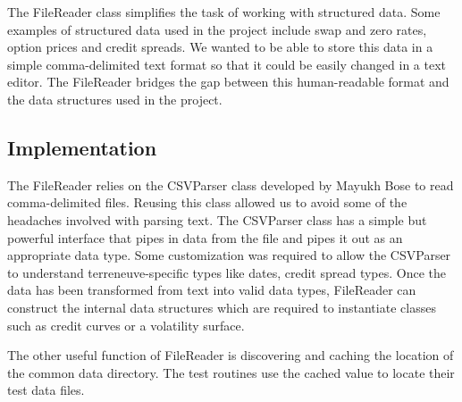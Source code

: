 The FileReader class simplifies the task of working with structured data.  Some examples of structured data used in the project include swap and zero rates, option prices and credit spreads.  We wanted to be able to store this data in a simple comma-delimited text format so that it could be easily changed in a text editor.  The FileReader bridges the gap between this human-readable format and the data structures used in the project.  

\subsection{Implementation}

The FileReader relies on the CSVParser class developed by Mayukh Bose to read comma-delimited files.  Reusing this class allowed us to avoid some of the headaches involved with parsing text.  The CSVParser class has a simple but powerful interface that pipes in data from the file and pipes it out as an appropriate data type.  Some customization was required to allow the CSVParser to understand terreneuve-specific types like dates, credit spread types.  Once the data has been transformed from text into valid data types, FileReader can construct the internal data structures which are required to instantiate classes such as credit curves or a volatility surface.  

The other useful function of FileReader is discovering and caching the location of the common data directory.  The test routines use the cached value to locate their test data files.